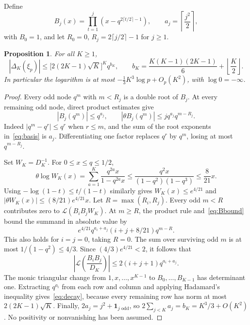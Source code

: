 \documentclass[11pt,letterpaper]{article}
\numberwithin{equation}{section}
\newtheorem{proposition}[theorem]{Proposition}
\theoremstyle{remark}\newtheorem{remark}[theorem]{Remark}
\newcommand{\Lcal}{\mathcal L}\newcommand{\Fcal}{\mathcal F}
\begin{document}
Define
\begin{equation}\label{eq:basis}
 B_j(x)=\prod_{t=1}^j\left(x-q^{2\lceil t/2\rceil-1}\right),\qquad
 a_j=\left\lceil\frac{j^2}{2}\right\rceil,
\end{equation}
with $B_0=1$, and let $R_0=0$, $R_j=2\lceil j/2\rceil-1$ for $j\ge1$.
\begin{proposition}\label{prop:decay}
For all $K\ge1$,
\begin{equation}\label{eq:decay}
 |\Delta_K(\xi_p)|
 \le\bigl[2(2K-1)\sqrt K\bigr]^K q^{b_K},\qquad
 b_K=\frac{K(K-1)(2K-1)}6+\left\lfloor\frac K2\right\rfloor.
\end{equation}
In particular the logarithm is at most $-\frac13K^3\log p+O_p(K^2)$, with $\log0=-\infty$.
\end{proposition}
\begin{proof}
Every odd node $q^m$ with $m<R_j$ is a double root of $B_j$. At every remaining odd node, direct product estimates give
\begin{equation}\label{eq:Bbound}
 |B_j(q^m)|\le q^{a_j},\qquad
 |\theta B_j(q^m)|\le j q^{a_j}q^{m-R_j}.
\end{equation}
Indeed $|q^m-q^r|\le q^r$ when $r\le m$, and the sum of the root exponents in~\eqref{eq:basis} is $a_j$. Differentiating one factor replaces $q^r$ by $q^m$, losing at most $q^{m-R_j}$.

Set $W_K=D_K^{-1}$. For $0\le x\le q\le1/2$,
\begin{equation*}
 \theta\log W_K(x)=\sum_{a=1}^K\frac{q^{2a}x}{1-q^{2a}x}
 \le\frac{q^2x}{(1-q^2)(1-q^3)}\le\frac8{21}x.
\end{equation*}
Using $-\log(1-t)\le t/(1-t)$ similarly gives
$W_K(x)\le e^{4/21}$ and $|\theta W_K(x)|\le(8/21)e^{4/21}x$.
Let $R=\max(R_i,R_j)$. Every odd $m<R$ contributes zero to $\Lcal(B_iB_jW_K)$. At $m\ge R$, the product rule and~\eqref{eq:Bbound} bound the summand in absolute value by
\begin{equation*}
 e^{4/21}q^{a_i+a_j}(i+j+8/21)q^{m-R}.
\end{equation*}
This also holds for $i=j=0$, taking $R=0$. The sum over surviving odd $m$ is at most $1/(1-q^2)\le4/3$. Since $(4/3)e^{4/21}<2$, it follows that
\begin{equation}\label{eq:matrixbound}
 \left|\Lcal\left(\frac{B_iB_j}{D_K}\right)\right|
 \le2(i+j+1)q^{a_i+a_j}.
\end{equation}
The monic triangular change from $1,x,\ldots,x^{K-1}$ to $B_0,\ldots,B_{K-1}$ has determinant one. Extracting $q^{a_i}$ from each row and column and applying Hadamard's inequality gives~\eqref{eq:decay}, because every remaining row has norm at most $2(2K-1)\sqrt K$. Finally,
$2a_j=j^2+\mathbf1_{j\text{ odd}}$, so $2\sum_{j<K}a_j=b_K=K^3/3+O(K^2)$. No positivity or nonvanishing has been assumed.
\end{proof}
\end{document}
